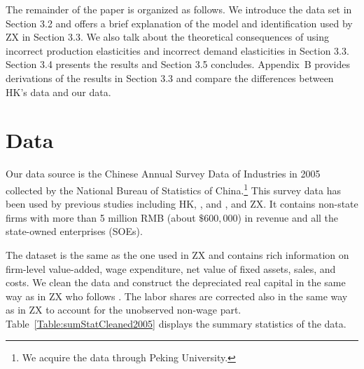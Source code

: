 \documentclass[12pt]{article}
\begin{document}
The remainder of the paper is organized as follows. We introduce the data set in Section 3.2 and offers a brief explanation of the model and identification used by ZX in Section 3.3. We also talk about the theoretical consequences of using incorrect production elasticities and incorrect demand elasticities in Section 3.3. Section 3.4 presents the results and Section 3.5 concludes. Appendix~B provides derivations of the results in Section 3.3 and compare the differences between HK's data and our data. %

\section{Data} \label{sec:data}
Our data source is the Chinese Annual Survey Data of Industries in 2005 collected by the National Bureau of Statistics of China.\footnote{We acquire the data through Peking University.} This survey data has been used by previous studies including HK, \citet{songGrowingChina2011}, and \citet{davidSourcesCapitalMisallocation2019}, and ZX. It contains non-state firms with more than 5 million RMB (about $\$600,000$) in revenue and all the state-owned enterprises (SOEs). %

The dataset is the same as the one used in ZX and contains rich information on firm-level value-added, wage expenditure, net value of fixed assets, sales, and costs. We clean the data and construct the depreciated real capital in the same way as in ZX who follows \citet{brandtCreativeAccountingCreative2012}. The labor shares are corrected also in the same way as in ZX to account for the unobserved non-wage part. Table~\ref{Table:sumStatCleaned2005} displays the summary statistics of the data.%

\end{document}
